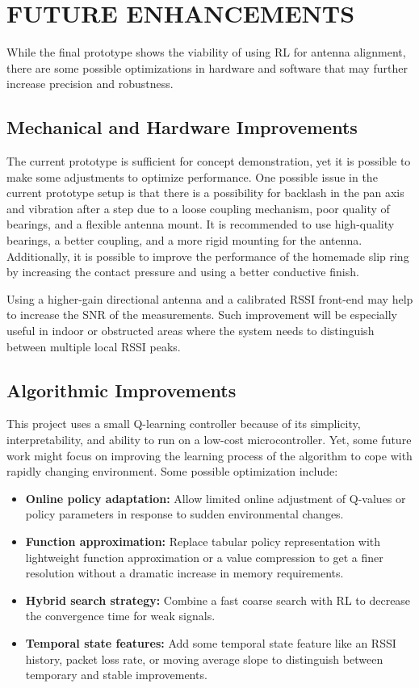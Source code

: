 \newpage
\section{FUTURE ENHANCEMENTS}

While the final prototype shows the viability of using RL for antenna alignment, there are some possible optimizations in hardware and software that may further increase precision and robustness.


\subsection{Mechanical and Hardware Improvements}

The current prototype is sufficient for concept demonstration, yet it is possible to make some adjustments to optimize performance. One possible issue in the current prototype setup is that there is a possibility for backlash in the pan axis and vibration after a step due to a loose coupling mechanism, poor quality of bearings, and a flexible antenna mount. It is recommended to use high-quality bearings, a better coupling, and a more rigid mounting for the antenna. Additionally, it is possible to improve the performance of the homemade slip ring by increasing the contact pressure and using a better conductive finish.

Using a higher-gain directional antenna and a calibrated RSSI front-end may help to increase the SNR of the measurements. Such improvement will be especially useful in indoor or obstructed areas where the system needs to distinguish between multiple local RSSI peaks.


\subsection{Algorithmic Improvements}

This project uses a small Q-learning controller because of its simplicity, interpretability, and ability to run on a low-cost microcontroller. Yet, some future work might focus on improving the learning process of the algorithm to cope with rapidly changing environment. Some possible optimization include:

\begin{itemize}
    \item \textbf{Online policy adaptation:} Allow limited online adjustment of Q-values or policy parameters in response to sudden environmental changes.
    \item \textbf{Function approximation:} Replace tabular policy representation with lightweight function approximation or a value compression to get a finer resolution without a dramatic increase in memory requirements.
    \item \textbf{Hybrid search strategy:} Combine a fast coarse search with RL to decrease the convergence time for weak signals.
    \item \textbf{Temporal state features:} Add some temporal state feature like an RSSI history, packet loss rate, or moving average slope to distinguish between temporary and stable improvements.
\end{itemize}


